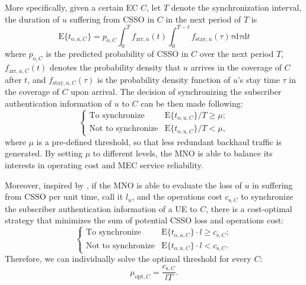 \documentclass{ieeeaccess}
\newcommand{\change}[1]{#1}
\begin{document}
	\change{More specifically, given a certain EC $C$,  let $T$ denote the synchronization interval, the duration of $u$ suffering from CSSO in $C$ in the next period of $T$ is
	\begin{equation}
		\text{E}\{t_{\text{o},u,C}\}=p_{\text{o},C}\int_{0}^{T}f_{\text{arr},u}(t)\int_{0}^{T-t}f_{\text{stay},u}(\tau)\tau\text{d}\tau\text{d}t
	\end{equation}
	where $p_{\text{o},C}$ is the predicted probability of CSSO in $C$ over the next period $T$, $f_{\text{arr},u,C}(t)$ denotes the probability density that $u$ arrives in the coverage of $C$ after $t$, and $f_{\text{stay},u,C}(\tau)$ is the probability density function of $u$'s stay time $\tau$ in the coverage of $C$ upon arrival.	The decision of synchronizing the subscriber authentication information of $u$ to $C$ can be then made following:
	\begin{equation}\label{equ:sync_decision}
		\begin{cases}
			\text{To synchronize} & \text{E}\{t_{\text{o},u,C}\}/T\geq \mu;\\
			\text{Not to synchronize} &\text{E}\{t_{\text{o},u,C}\}/T< \mu,
		\end{cases}
	\end{equation}
	where $\mu$ is a pre-defined threshold,	so that less redundant backhaul traffic is generated. By setting $\mu$ to different levels, the MNO is able to balance its interests in operating cost and MEC service reliability.}
	
	\change{
	Moreover, inspired by \cite{han2018island}, if the MNO is able to evaluate the loss of $u$ in suffering from CSSO per unit time, call it $l_u$, and the operations cost $c_{\text{s},C}$ to synchronize the subscriber authentication information of a UE to $C$, there is a cost-optimal strategy that minimizes the sum of potential CSSO loss and operations cost:
	\begin{equation}
		\begin{cases}
			\text{To synchronize} & \text{E}\{t_{\text{o},u,C}\}\cdot l\ge c_{\text{s},C};\\
			\text{Not to synchronize} &\text{E}\{t_{\text{o},u,C}\}\cdot l< c_{\text{s},C}.
		\end{cases}
	\end{equation}
	Therefore, we can individually solve the optimal threshold for every $C$:
	\begin{equation}\label{eq:opt_threshold}
		\mu_{\text{opt},C}=\frac{c_{\text{s},C}}{lT}.
	\end{equation}
    }
	
\end{document}

